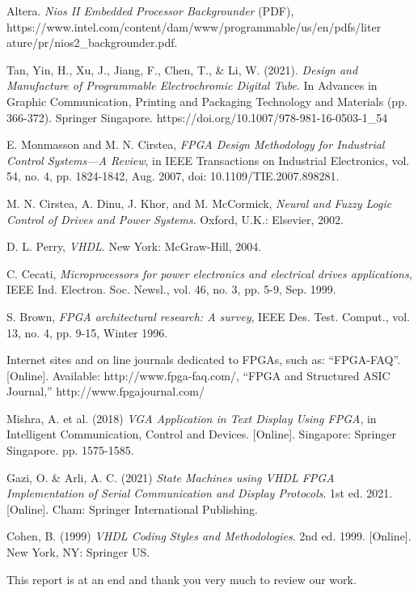 \documentclass[conference]{IEEEtran}
\begin{document}
\begin{thebibliography}{20}
    Altera. \emph{Nios II Embedded Processor Backgrounder} (PDF), https://www.intel.com/content/dam/www/programmable/us/en/pdfs/liter\\ature/pr/nios2\_backgrounder.pdf.

    Tan, Yin, H., Xu, J., Jiang, F., Chen, T., \& Li, W. (2021). \emph{Design and Manufacture of Programmable Electrochromic Digital Tube}. In Advances in Graphic Communication, Printing and Packaging Technology and Materials (pp. 366-372). Springer Singapore. https://doi.org/10.1007/978-981-16-0503-1\_54

    E. Monmasson and M. N. Cirstea, \emph{FPGA Design Methodology for Industrial Control Systems—A Review}, in IEEE Transactions on Industrial Electronics, vol. 54, no. 4, pp. 1824-1842, Aug. 2007, doi: 10.1109/TIE.2007.898281.

    M. N. Cirstea, A. Dinu, J. Khor, and M. McCormick, \emph{Neural and Fuzzy Logic Control of Drives and Power Systems}. Oxford, U.K.: Elsevier, 2002.

    D. L. Perry, \emph{VHDL}. New York: McGraw-Hill, 2004.

    C. Cecati, \emph{Microprocessors for power electronics and electrical drives applications}, IEEE Ind. Electron. Soc. Newsl., vol. 46, no. 3, pp. 5-9, Sep. 1999.

    S. Brown, \emph{FPGA architectural research: A survey}, IEEE Des. Test. Comput., vol. 13, no. 4, pp. 9-15, Winter 1996.

    Internet sites and on line journals dedicated to FPGAs, such as: “FPGA-FAQ”. [Online]. Available: http://www.fpga-faq.com/, “FPGA and Structured ASIC Journal,” http://www.fpgajournal.com/

    Mishra, A. et al. (2018) \emph{VGA Application in Text Display Using FPGA}, in Intelligent Communication, Control and Devices. [Online]. Singapore: Springer Singapore. pp. 1575-1585.

    Gazi, O. \& Arli, A. C. (2021) \emph{State Machines using VHDL FPGA Implementation of Serial Communication and Display Protocols}. 1st ed. 2021. [Online]. Cham: Springer International Publishing.

      Cohen, B. (1999) \emph{VHDL Coding Styles and Methodologies}. 2nd ed. 1999. [Online]. New York, NY: Springer US.
\end{thebibliography}

This report is at an end and thank you very much to review our work.
\end{document}
